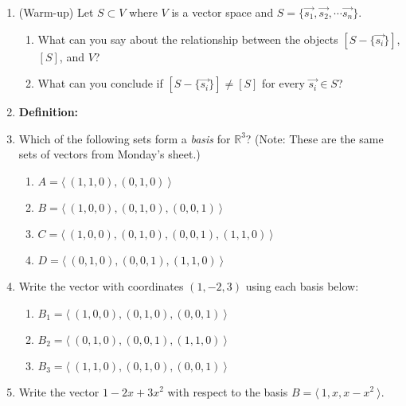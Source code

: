 \documentclass[11pt,fleqn]{article}
\begin{document}
\renewcommand{\headrulewidth}{0pt}
\newcommand{\blank}[1]{\rule{#1}{0.75pt}}
\renewcommand{\d}{\displaystyle}

\vspace*{-0.7in}

\begin{center}
  \large {}
\end{center}
\begin{enumerate}
\item (Warm-up) Let $S \subset V$ where $V$ is a vector space and $S=\{\vec{s_1}, \vec{s_2},\cdots \vec{s_n}\}.$ 
	\begin{enumerate}
	\item What can you say about the relationship between the objects $[ S-\{\vec{s_i}\}]$, $[S]$, and $V$?
	\vspace{1in}
	\item What can you conclude if  $[ S-\{\vec{s_i}\}]\not =[S]$ for every $\vec{s_i} \in S$?
	\vspace{1.5in}
	\end{enumerate}
\item \textbf{Definition:}
\vspace{1in}
\item Which of the following sets form a \emph{basis} for $\mathbb{R}^3$? (Note: These are the same sets of vectors from Monday's sheet.)
	\begin{enumerate}
	\item $A=\langle\:(1,1,0),(0,1,0) \:\rangle$
	\vfill
	\item $B=\langle\:(1,0,0),(0,1,0),(0,0,1) \:\rangle$
	\vfill
	\item $C=\langle\:(1,0,0),(0,1,0),(0,0,1),(1,1,0) \:\rangle$
	\vfill
	\item $D=\langle\:(0,1,0),(0,0,1),(1,1,0) \:\rangle$
	\vfill
	\end{enumerate}
\newpage
\item Write the vector with coordinates $(1,-2,3)$ using each basis below:
	\begin{enumerate}
	\item $B_1=\langle\:(1,0,0),(0,1,0),(0,0,1) \:\rangle$
	\vfill
	\item $B_2=\langle\:(0,1,0),(0,0,1),(1,1,0) \:\rangle$
	\vfill
	\item $B_3=\langle\:(1,1,0) ,(0,1,0),(0,0,1)\:\rangle$
	\vfill
	\end{enumerate}
\item Write the vector $1-2x+3x^2$ with respect to the basis $B=\langle \: 1,x,x-x^2 \: \rangle.$
\vfill


 \end{enumerate}
\end{document}
